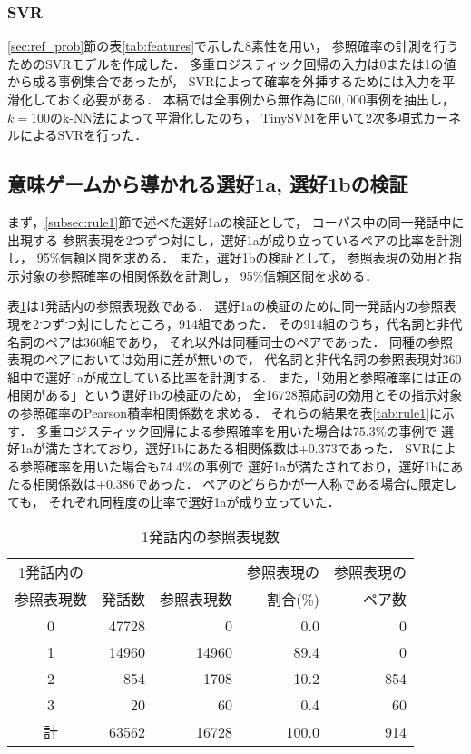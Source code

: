 \subsubsection{SVR}
\ref{sec:ref_prob}節の表\ref{tab:features}で示した8素性を用い，
参照確率の計測を行うためのSVRモデルを作成した．
多重ロジスティック回帰の入力は0または1の値から成る事例集合であったが，
SVRによって確率を外挿するためには入力を平滑化しておく必要がある．
本稿では全事例から無作為に$60,000$事例を抽出し，
$k=100$のk-NN法によって平滑化したのち，
TinySVM\cite{tinysvm}を用いて2次多項式カーネルによるSVRを行った．




\subsection{意味ゲームから導かれる選好1a, 選好1bの検証}
まず，\ref{subsec:rule1}節で述べた選好1aの検証として，
コーパス中の同一発話中に出現する
参照表現を2つずつ対にし，選好1aが成り立っているペアの比率を計測し，
95\%信頼区間を求める．
また，選好1bの検証として，
参照表現の効用と指示対象の参照確率の相関係数を計測し，
95\%信頼区間を求める．


表\ref{tab:per_uttr}は1発話内の参照表現数である．
選好1aの検証のために同一発話内の参照表現を2つずつ対にしたところ，914組であった．
その914組のうち，代名詞と非代名詞のペアは360組であり，
それ以外は同種同士のペアであった．
同種の参照表現のペアにおいては効用に差が無いので，
代名詞と非代名詞の参照表現対360組中で選好1aが成立している比率を計測する．
また，「効用と参照確率には正の相関がある」という選好1bの検証のため，
全16728照応詞の効用とその指示対象の参照確率のPearson積率相関係数を求める．
それらの結果を表\ref{tab:rule1}に示す．
多重ロジスティック回帰による参照確率を用いた場合は75.3\%の事例で
選好1aが満たされており，選好1bにあたる相関係数は+0.373であった．
SVRによる参照確率を用いた場合も74.4\%の事例で
選好1aが満たされており，選好1bにあたる相関係数は+0.386であった．
ペアのどちらかが一人称である場合に限定しても，
それぞれ同程度の比率で選好1aが成り立っていた．

\begin{table}
\begin{center}
\begin{tabular}{|c||r|r|r|r|}
\hline
1発話内の&&&参照表現の&参照表現の\\
参照表現数&発話数&参照表現数&割合(\%)&ペア数　\\
\hline\hline
0&47728&0&0.0&0\\
1&14960&14960&89.4&0\\
2&854&1708&10.2&854\\
3&20&60&0.4&60\\
\hline
計&63562&16728&100.0&914\\
\hline
\end{tabular}
\end{center}
\caption{1発話内の参照表現数}
\label{tab:per_uttr}
\end{table}


